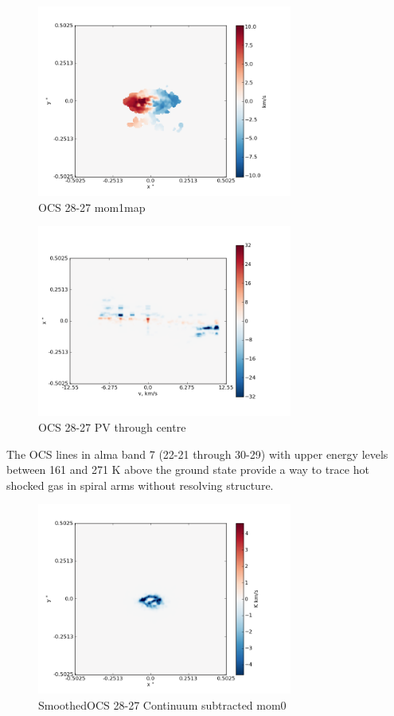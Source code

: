 \documentclass[useAMS,usenatbib]{mn2e}
\begin{document}
\begin{figure}
 \includegraphics[width=84mm]{Figures/sim/imageOCS_28-27_30deg_mom1.png}

 \caption{OCS 28-27 mom1map}
\end{figure}

\begin{figure}
 \includegraphics[width=84mm]{Figures/sim/imageOCS_28-27_30deg_PV_centre.png}

 \caption{OCS 28-27 PV through centre}
\end{figure}

The OCS lines in alma band 7 (22-21 through 30-29) with upper energy levels between 161 and 271 K above the ground state provide a way to trace hot shocked gas in spiral arms without resolving structure.

\begin{figure}
 \includegraphics[width=84mm]{Figures/sim/imagesmoothedOCS_28-27_30deg_contSub.png}

 \caption{SmoothedOCS 28-27 Continuum subtracted mom0}
\end{figure}
\end{document}
